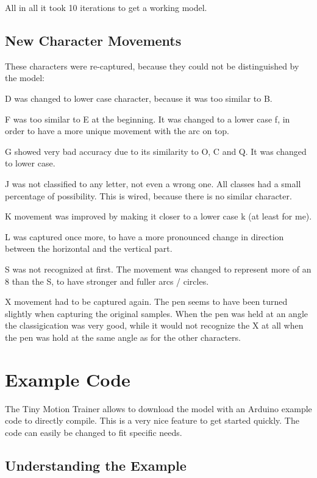 \documentclass[a4paper,titlepage]{article}
\begin{document}
All in all it took 10 iterations to get a working model.

\newpage
\subsection{New Character Movements}

These characters were re-captured, because they could not be distinguished by the model:

D was changed to lower case character, because it was too similar to B.

F was too similar to E at the beginning.
It was changed to a lower case f, in order to have a more unique movement with the arc on top.

G showed very bad accuracy due to its similarity to O, C and Q.
It was changed to lower case.

J was not classified to any letter, not even a wrong one.
All classes had a small percentage of possibility.
This is wired, because there is no similar character.

K movement was improved by making it closer to a lower case k (at least for me).

L was captured once more, to have a more pronounced change in direction between the horizontal and the vertical part.

S was not recognized at first.
The movement was changed to represent more of an 8 than the S, to have stronger and fuller arcs / circles.

X movement had to be captured again.
The pen seems to have been turned slightly when capturing the original samples.
When the pen was held at an angle the classigication was very good, while it would not recognize the X at all when the pen was hold at the same angle as for the other characters.

\newpage
\section{Example Code}

The Tiny Motion Trainer allows to download the model with an Arduino example code to directly compile.
This is a very nice feature to get started quickly.
The code can easily be changed to fit specific needs.

\subsection{Understanding the Example}
\end{document}
